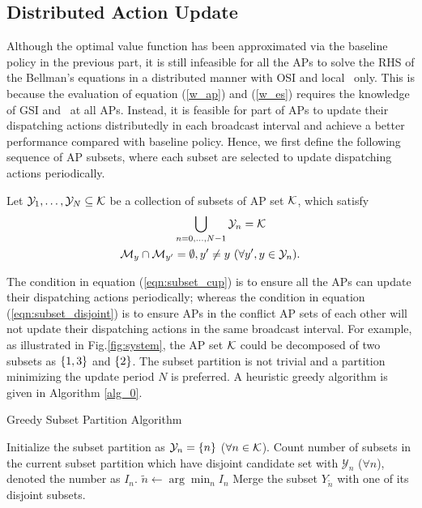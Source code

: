 \subsection{Distributed Action Update}
\label{subsec:ap_alg}
Although the optimal value function has been approximated via the baseline policy in the previous part, it is still infeasible for all the APs to solve the RHS of the Bellman's equations in a distributed manner with OSI and local \brlatency~only.
This is because the evaluation of equation (\ref{w_ap}) and (\ref{w_es}) requires the knowledge of GSI and \brlatency~at all APs.
Instead, it is feasible for part of APs to update their dispatching actions distributedly in each broadcast interval and achieve a better performance compared with baseline policy.
Hence, we first define the following sequence of AP subsets, where each subset are selected to update dispatching actions periodically.
\begin{definition}
    Let $\mathcal{Y}_{1}, \dots, \mathcal{Y}_{N} \subseteq \mathcal{K}$ be a collection of subsets of AP set $\mathcal{K}$, which satisfy
    \begin{align}
        &\bigcup_{n=0,\dots,N-1} \mathcal{Y}_{n} = \mathcal{K}
        \label{eqn:subset_cup}
        \\
        \mathcal{M}_{y} \cap \mathcal{M}_{y'} &=\emptyset, y' \neq y~(\forall y',y \in \mathcal{Y}_{n}).
        \label{eqn:subset_disjoint}
    \end{align}
\end{definition}
The condition in equation (\ref{eqn:subset_cup}) is to ensure all the APs can update their dispatching actions periodically; whereas the condition in equation (\ref{eqn:subset_disjoint}) is to ensure APs in the conflict AP sets of each other will not update their dispatching actions in the same broadcast interval.
For example, as illustrated in Fig.\ref{fig:system}, the AP set $\mathcal{K}$ could be decomposed of two subsets as $\{1,3\}$ and $\{2\}$.
The subset partition is not trivial and a partition minimizing the update period $N$ is preferred.
A heuristic greedy algorithm is given in Algorithm \ref{alg_0}.
\begin{algorithm}[ht]
    \caption{Greedy Subset Partition Algorithm}\label{alg_0}
    \DontPrintSemicolon %
    Initialize the subset partition as $\mathcal{Y}_{n} = \{n\}$ ($\forall n\in\mathcal{K}$).\;
    {
        Count number of subsets in the current subset partition which have disjoint candidate set with $\mathcal{Y}_n$ ($\forall n$), denoted the number as $I_{n}$.\;
        $\tilde{n} \gets \arg\min_{n} I_{n}$\;
        Merge the subset $Y_{\tilde{n}}$ with one of its disjoint subsets.\;
    }
\end{algorithm}

